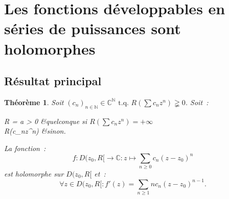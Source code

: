 \documentclass{report}
\newtheorem{thm}{Théorème}[chapter]
\theoremstyle{definition}
\theoremstyle{remark}
\numberwithin{equation}{section}
\newcommand{\C}{\mathbb C}
\newcommand{\N}{\mathbb N}
\newcommand{\tq}{\text{ t.q. }}
\newcommand{\pinfty}{{+\infty}}
\begin{document}
	\section{Les fonctions développables en séries de puissances sont holomorphes}
		\subsection{Résultat principal}
			\begin{thm} Soit $(c_n)_{n \in \N} \in \C^\N \tq R\left(\sum c_nz^n\right) \gneqq 0$.
			Soit~:
			\begin{subnumcases}
				{R = }
					a > 0 &quelconque si $R\left(\sum c_nz^n\right) = \pinfty$ \\
					R\left(\sum c_nz^n\right) &sinon.
			\end{subnumcases}

			La fonction~:
			\begin{equation}\label{eq:f DSP}
				f : D(z_0, R[ \to \C : z \mapsto \sum_{n \geq 0}c_n(z-z_0)^n
			\end{equation}
			est holomorphe sur $D(z_0, R[$ et~:
			\begin{equation}\label{eq:DSP => holomorphe}
				\forall z \in D(z_0, R[ : f'(z) = \sum_{n \geq 1}nc_n(z-z_0)^{n-1}.
			\end{equation}
			\end{thm}
\end{document}
